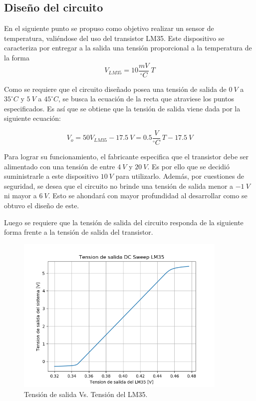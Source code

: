 \documentclass[a4paper]{article}
\begin{document}
\tableofcontents

\newpage

\subsection{Diseño del circuito}

En el siguiente punto se propuso como objetivo realizar un sensor de temperatura, valiéndose del uso del transistor LM35. Este dispositivo se caracteriza por entregar a la salida una tensión proporcional a la temperatura de la forma
\[
	V_{LM35} = 10 \frac{mV}{^{\circ}C} \ T
\]

Como se requiere que el circuito diseñado posea una tensión de salida de $ 0 \ V $ a $ 35 ^{\circ}C $ y $ 5 \ V $ a $ 45 ^{\circ}C $, se busca la ecuación de la recta que atraviese los puntos especificados. Es así que se obtiene que la tensión de salida viene dada por la siguiente ecuación:

\begin{equation}
	V_{o} = 50V_{LM35} - 17.5 \ V =  0.5 \frac{V}{^{\circ}C} \ T - 17.5 \ V
	\label{equ:sistema}
\end{equation}

Para lograr su funcionamiento, el fabricante especifica que el transistor debe ser alimentado con una tensión de entre $4 \ V$ y $20 \ V$. Es por ello que se decidió suministrarle a este dispositivo $10 \ V$ para utilizarlo. Además, por cuestiones de seguridad, se desea que el circuito no brinde una tensión de salida menor a $-1 \ V$ ni mayor a $6 \ V$. Esto se ahondará con mayor profundidad al desarrollar como se obtuvo el diseño de este.

Luego se requiere que la tensión de salida del circuito responda de la siguiente forma frente a la tensión de salida del transistor.

\begin{figure}[H]
	\centering
	\includegraphics[width=0.9\textwidth]{Ejercicio6/Imagenes/SalidaVsVLM35.png}
\caption{Tensión de salida Vs. Tensión del LM35.}
	\label{fig:vout}
\end{figure}
\end{document}
